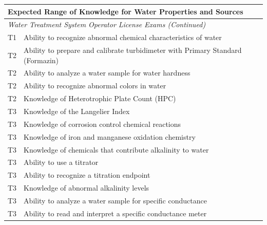 \begin{table}[H]
\begin{tabular}{| m{1cm} |m{15cm} |}
\hline
\multicolumn{2}{|l|}{\textbf{Expected   Range of Knowledge for Water Properties and Sources}}                                                                      \\ \hline
\multicolumn{2}{|l|}{\textit{Water   Treatment System Operator License Exams (Continued)}}                                                                  \\ \hline
T1 & Ability to recognize   abnormal chemical characteristics of water                                 \\ \hline
T2 & Ability to prepare   and calibrate turbidimeter with Primary Standard (Formazin)                  \\ \hline
T2 & Ability to analyze a   water sample for water hardness                                            \\ \hline
T2 & Ability to recognize   abnormal colors in water                                                   \\ \hline
T2 & Knowledge of   Heterotrophic Plate Count (HPC)                                                    \\ \hline
T3 & Knowledge of the   Langelier Index                                                                \\ \hline
T3 & Knowledge of   corrosion control chemical reactions                                               \\ \hline
T3 & Knowledge of iron and   manganese oxidation chemistry                                             \\ \hline
T3 & Knowledge of   chemicals that contribute alkalinity to water                                      \\ \hline
T3 & Ability to use a   titrator                                                                       \\ \hline
T3 & Ability to recognize   a titration endpoint                                                       \\ \hline
T3 & Knowledge of abnormal   alkalinity levels                                                         \\ \hline
T3 & Ability to analyze a   water sample for specific conductance                                      \\ \hline
T3 & Ability to read and   interpret a specific conductance meter                                      \\ \hline

\end{tabular}
\end{table}
